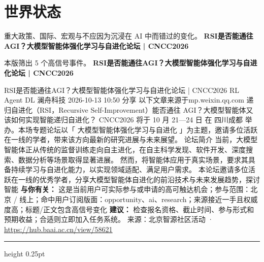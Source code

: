 \documentclass[10.5pt]{ctexart}
\begin{document}
\section*{世界状态}
{\color{ormuted} 重大政策、国际、宏观与不应因为沉浸在 AI 中而错过的变化。}
\vspace{2mm}
{\LARGE\bfseries RSI是否能通往AGI？大模型智能体强化学习与自进化论坛 | CNCC2026}\par
\vspace{1mm}
{\color{ormuted} 本版筛出 5 个高信号事件。}
\vspace{3mm}
{\Large\bfseries RSI是否能通往AGI？大模型智能体强化学习与自进化论坛 | CNCC2026}\par
RSI是否能通往AGI？大模型智能体强化学习与自进化论坛 | CNCC2026 RL Agent DL 澜舟科技 2026-10-13 10:50 分享 以下文章来源于mp.weixin.qq.com 递归自进化（RSI，Recursive Self-Improvement）能否通往 AGI？大模型智能体又该如何实现智能递归自进化？ CNCC2026 将于 10 月 21—24 日 在 四川成都 举办。本场专题论坛以「 大模型智能体强化学习与自进化 」为主题，邀请多位活跃在一线的学者，带来该方向最新的研究进展与未来展望。 论坛简介 当前，大模型智能体正从传统的监督训练走向自主进化，在自主科学发现、软件开发、深度搜索、数据分析等场景取得显著进展。 然而，将智能体应用于真实场景，要求其具备持续学习与自进化能力，以实现领域适配、满足用户需求。 本论坛邀请多位活跃在一线的优秀学者，分享大模型智能体自进化的前沿技术与未来发展趋势，探讨智能
\textbf{与你有关：} 这是当前用户可实际参与或申请的高可触达机会；参与范围：北京 / 线上；命中用户订阅版面：opportunity、ai、research；来源接近一手且权威度高；标题/正文包含高信号变化
\textbf{建议：} 检查报名资格、截止时间、参与形式和预期收益；合适则立即加入任务系统。
{\footnotesize\color{ormuted} 来源：北京智源社区活动 · \url{https://hub.baai.ac.cn/view/58621}}
\vspace{4mm}
\hrule height 0.25pt
\vspace{3mm}
\end{document}
